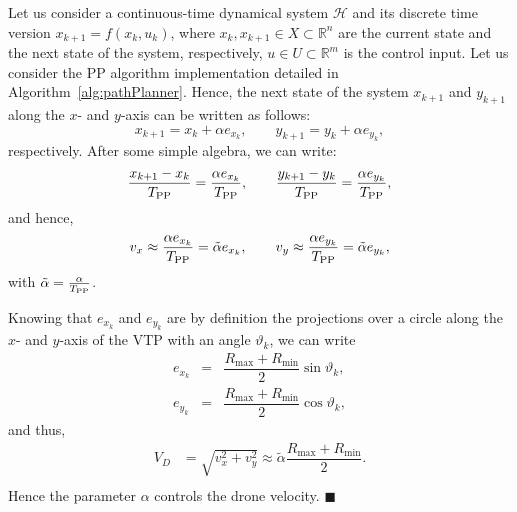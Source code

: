 \documentclass[a4paper,twocolumn,10pt]{article}
\begin{document}
    \begin{appendix}
        \label{appendix}
        
        Let us consider a continuous-time dynamical system $\mathcal{H}$ and its discrete time version 
        $x_{k+1}=f(x_k,u_k)$, where $x_k, x_{k+1} \in X \subset \mathbb{R}^n$ are the current state and 
        the next state of the system, respectively, $u \in U \subset \mathbb{R}^m$ is the control 
        input. Let us consider the PP algorithm implementation detailed in 
        Algorithm~\ref{alg:pathPlanner}. Hence, the next state of the system $x_{k+1}$ and $y_{k+1}$ 
        along the $x$- and $y$-axis can be written as follows:
        \begin{equation}
            x_{k+1} = x_k + \alpha e_{x_k}, \qquad y_{k+1} = y_k + \alpha e_{y_k},
        \end{equation}
        respectively. After some simple algebra, we can write:
        \begin{equation}
            \dfrac{x_{k+1}-x_k}{T_{\rm PP}} = \dfrac{\alpha e_{x_k}}{T_{\rm PP}}, \qquad 
            \dfrac{y_{k+1}-y_k}{T_{\rm PP}} = \dfrac{\alpha e_{y_k}}{T_{\rm PP}}, 
        \end{equation}
        and hence,
        \begin{equation}
            v_x \approx \dfrac{\alpha e_{x_k}}{T_{\rm PP}} = \tilde{\alpha} e_{x_k}, \qquad 
            v_y  \approx  \dfrac{\alpha e_{y_k}}{T_{\rm PP}} = \tilde{\alpha} e_{y_k},
        \end{equation}
        with $\tilde{\alpha} = \frac{\alpha}{T_{\rm PP}}$.
        
        Knowing that $e_{x_k}$ and $e_{y_k}$ are by definition the projections over a circle along the 
        $x$- and $y$-axis of the VTP with an angle $\vartheta_k$, we can write
        \begin{equation}
            \begin{array}{rll}
                e_{x_k} &=& \dfrac{R_\mathrm{max}+R_\mathrm{min}}{2} \sin{\vartheta_k},\\[10pt]
                e_{y_k} &=& \dfrac{R_\mathrm{max}+R_\mathrm{min}}{2} \cos{\vartheta_k},
            \end{array}
        \end{equation}
        and thus,
        \begin{equation} 
            \begin{split}
                V_D & = \sqrt{v_x^2 + v_y^2} \approx \tilde{\alpha} 
                \dfrac{R_\mathrm{max}+R_\mathrm{min}}{2}. \\
            \end{split}
        \end{equation}
        Hence the parameter $\alpha$ controls the drone velocity. 
        \hspace*{\fill} $\blacksquare$ 
    \end{appendix}
\end{document}

